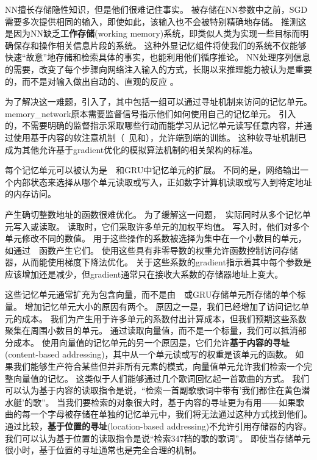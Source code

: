 \gls{NN}擅长存储隐性知识，但是他们很难记住事实。
被存储在\gls{NN}参数中之前，\gls{SGD}需要多次提供相同的输入，即使如此，该输入也不会被特别精确地存储。
\citet{Graves-et-al-arxiv2014}推测这是因为\gls{NN}缺乏\textbf{工作存储}(working memory)系统，即类似人类为实现一些目标而明确保存和操作相关信息片段的系统。
这种外显记忆组件将使我们的系统不仅能够快速``故意''地存储和检索具体的事实，也能利用他们循序推论。
\gls{NN}处理序列信息的需要，改变了每个步骤向网络注入输入的方式，长期以来推理能力被认为是重要的，而不是对输入做出自动的、直观的反应\citep{hinton1990mapping} 。


为了解决这一难题，\citet{Weston2014}引入了，其中包括一组可以通过寻址机制来访问的记忆单元。
\gls{memory_network}原本需要监督信号指示他们如何使用自己的记忆单元。
\citet{Graves-et-al-arxiv2014}引入的，不需要明确的监督指示采取哪些行动而能学习从记忆单元读写任意内容，并通过使用基于内容的软注意机制（~见\citet{Bahdanau-et-al-ICLR2015-small}和），允许端到端的训练。
这种软寻址机制已成为其他允许基于\gls{gradient}优化的模拟算法机制的相关架构的标准\citep{Sukhbaatar2015,Joulin+Mikolov-2015,Kumar-et-al-2015,Vinyals2015,Grefenstette-et-al-NIPS2015}。

每个记忆单元可以被认为是~~和GRU中记忆单元的扩展。
不同的是，网络输出一个内部状态来选择从哪个单元读取或写入，正如数字计算机读取或写入到特定地址的内存访问。


产生确切整数地址的函数很难优化。
为了缓解这一问题，~实际同时从多个记忆单元写入或读取。
读取时，它们采取许多单元的加权平均值。
写入时，他们对多个单元修改不同的数值。
用于这些操作的系数被选择为集中在一个小数目的单元，如通过~~函数产生它们。
使用这些具有非零导数的权重允许函数控制访问存储器，从而能使用梯度下降法优化。
关于这些系数的\gls{gradient}指示着其中每个参数是应该增加还是减少，但\gls{gradient}通常只在接收大系数的存储器地址上变大。

这些记忆单元通常扩充为包含向量，而不是由~~或GRU存储单元所存储的单个标量。
增加记忆单元大小的原因有两个。
原因之一是，我们已经增加了访问记忆单元的成本。
我们为产生用于许多单元的系数付出计算成本，但我们预期这些系数聚集在周围小数目的单元。
通过读取向量值，而不是一个标量，我们可以抵消部分成本。 
使用向量值的记忆单元的另一个原因是，它们允许\textbf{基于内容的寻址}(content-based addressing)，其中从一个单元读或写的权重是该单元的函数。
如果我们能够生产符合某些但并非所有元素的模式，向量值单元允许我们检索一个完整向量值的记忆。
这类似于人们能够通过几个歌词回忆起一首歌曲的方式。
我们可以认为基于内容的读取指令是说，``检索一首副歌歌词中带有'我们都住在黄色潜水艇'的歌''。
当我们要检索的对象很大时，基于内容的寻址更为有用——如果歌曲的每一个字母被存储在单独的记忆单元中，我们将无法通过这种方式找到他们。
通过比较，\textbf{基于位置的寻址}(location-based addressing)不允许引用存储器的内容。
我们可以认为基于位置的读取指令是说``检索347档的歌的歌词''。
即使当存储单元很小时，基于位置的寻址通常也是完全合理的机制。

